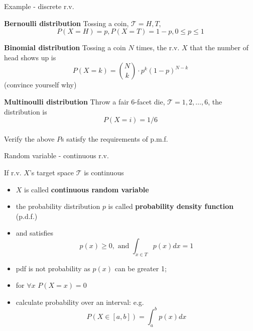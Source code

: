 \documentclass[ignorenonframetext,]{beamer}
\providecommand{\tightlist}{%
  \setlength{\itemsep}{0pt}\setlength{\parskip}{0pt}}
\begin{document}
\begin{frame}{Example - discrete r.v.}
\protect\hypertarget{example---discrete-r.v.}{}

\textbf{Bernoulli distribution} Tossing a coin,
\(\mathcal{T} = {H, T}\), \[P(X=H) = p , P(X=T) = 1-p, 0\leq p\leq 1\]

\textbf{Binomial distribution} Tossing a coin \(N\) times, the r.v.
\(X\) that the number of head shows up is
\[P(X=k) = \binom{N}{k} \cdot p^k(1-p)^{N-k}\] (convince yourself why)

\textbf{Multinoulli distribution} Throw a fair 6-facet die,
\(\mathcal{T} = {1, 2,\ldots, 6}\), the distribution is
\[P(X=i) = 1/6\]\\
Verify the above \(P\)s satisfy the requirements of p.m.f.

\end{frame}

\begin{frame}{Random variable - continuous r.v.}
\protect\hypertarget{random-variable---continuous-r.v.}{}

If r.v. \(X\)'s target space \(\mathcal{T}\) is continuous

\begin{itemize}
\tightlist
\item
  \(X\) is called \textbf{continuous random variable }
\item
  the probability distribution \(p\) is called \textbf{probability
  density function} (p.d.f.)
\item
  and satisfies \[p(x) \geq 0, \text{ and } \int_{x\in T} p(x) dx = 1\]
\item
  pdf is not probability as \(p(x)\) can be greater 1;
\item
  for \(\forall x\) \(P(X=x) =0\)\\
\item
  calculate probability over an interval: e.g.
  \[P(X \in [a,b]) = \int_{a}^b p(x) dx\]
\end{itemize}

\end{frame}
\end{document}
